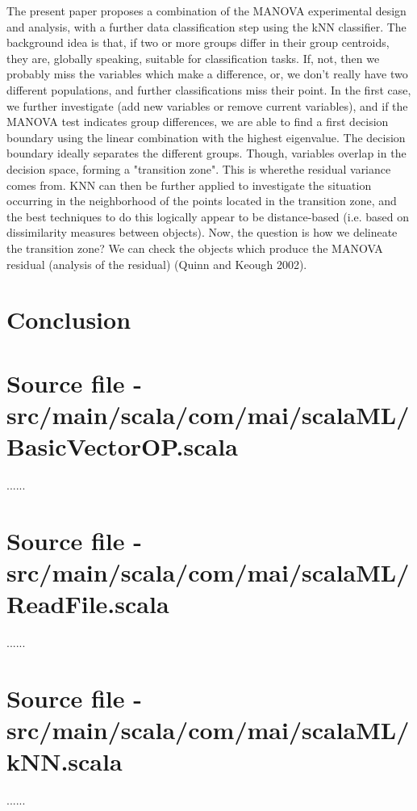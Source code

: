 \documentclass[journal]{IEEEtran}
\begin{document}
The present paper proposes a combination of the MANOVA experimental design and analysis, with a further data classification step using the kNN classifier. 
The background idea is that, if two or more groups differ in their group centroids, they are, globally speaking, suitable for classification tasks. If, not, then we probably miss the variables which make a difference, or, we don't really have two different populations, and further classifications miss their point.
In the first case, we further investigate (add new variables or remove current variables), and if the MANOVA test indicates group differences, we are able to find a first decision boundary using the linear combination with the highest eigenvalue. The decision boundary ideally separates the different groups. Though, variables overlap in the decision space, forming a "transition zone". This is wherethe residual variance comes from. KNN can then be further applied to investigate the situation occurring in the neighborhood of the points located in the transition zone, and the best techniques to do this logically appear to be distance-based (i.e. based on dissimilarity measures between objects). Now, the question is how we delineate the transition zone? We can check the objects which produce the MANOVA residual (analysis of the residual) (Quinn and Keough 2002).        

\section{Conclusion}



\appendices
\section{Source file - src/main/scala/com/mai/scalaML/BasicVectorOP.scala}

......

\section{Source file - src/main/scala/com/mai/scalaML/ReadFile.scala}

......

\section{Source file - src/main/scala/com/mai/scalaML/kNN.scala}

......
\end{document}
